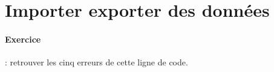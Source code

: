 \section{Importer exporter des données}

\paragraph{Exercice} : retrouver les cinq erreurs de cette ligne de code.

